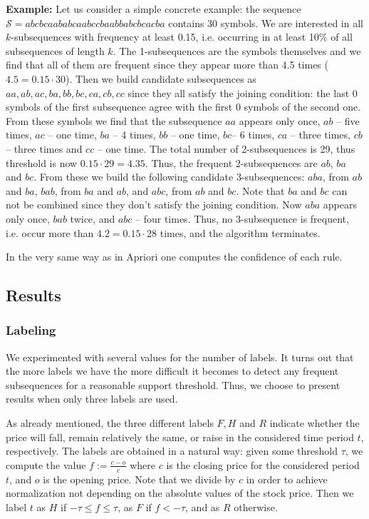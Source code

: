 \documentclass{llncs}
\begin{document}
{\bf Example:}  Let us consider a simple concrete example: the sequence $\mathcal{S} = abcbca ababca abccba abbabc bcacba$ contains 30 symbols. We are interested in all $k$-subsequences with frequency at least 0.15, i.e. occurring in at least 10\% of all subsequences of length $k$. The 1-subsequences are the symbols themselves and we find that all of them are frequent since they appear more than 4.5 times ($4.5 = 0.15\cdot 30$). Then we build candidate subsequences as $aa, ab, ac, ba, bb, bc, ca, cb, cc$ since they all satisfy the joining condition: the last 0 symbols of the first subsequence agree with the first 0 symbols of the second one. From these symbols we find that the subsequence $aa$ appears only once, $ab$ -- five times, $ac$ -- one time, $ba$ -- 4 times, $bb$ -- one time, $bc$-- 6 times, $ca$ -- three times, $cb$-- three times and $cc$ -- one time. The total number of 2-subsequences is 29, thus threshold is now $0.15 \cdot 29 = 4.35$. Thus, the frequent 2-subsequences are $ab$, $ba$ and $bc$. From these we build the following candidate 3-subsequences: $aba$, from $ab$ and $ba$, $bab$, from $ba$ and $ab$, and $abc$, from $ab$ and $bc$. Note that $ba$ and $bc$ can not be combined since they don't satisfy the joining condition. Now $aba$ appears only once, $bab$ twice, and $abc$ -- four times. Thus, no 3-subsequence is frequent, i.e. occur more than $4.2 = 0.15\cdot 28$ times, and the algorithm terminates.

In the very same way as in Apriori one computes the confidence of each rule.

\subsection*{Results}
\subsubsection*{Labeling}
We experimented with several values for the number of labels. It turns out that the more labels we have the more difficult it becomes to detect any frequent subsequences for a reasonable support threshold. Thus, we choose to present results when only three labels are used.  

As already mentioned, the three different labels $F, H$ and $R$ indicate whether the price will fall, remain relatively the same, or raise in the considered time period $t$, respectively. The labels are obtained in a natural way: given some threshold $\tau$, we compute the value $f:=\frac{c-o}{c}$ where $c$ is the closing price for the considered period $t$, and $o$ is the opening price. Note that we divide by $c$ in order to achieve normalization not depending on the absolute values of the stock price. Then we label $t$ as $H$ if $-\tau \leq f \leq \tau$, as $F$ if $f < -\tau$, and as $R$ otherwise. 
\end{document}
